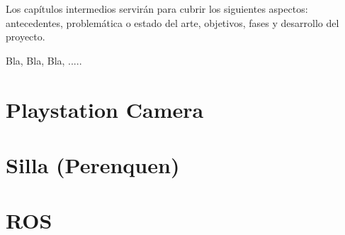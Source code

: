 
Los capítulos intermedios servirán para cubrir los siguientes aspectos:
antecedentes, problemática o estado del arte, objetivos, fases y desarrollo del proyecto.

Bla, Bla, Bla, .....


\section{Playstation Camera}
\label{3:sec1}


\section{Silla (Perenquen)}
\label{3:sec2}


\section{ROS}
\label{3:sec3}
